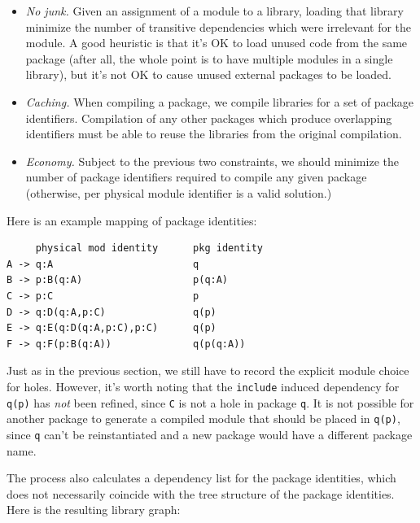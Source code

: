 \documentclass{article}
\begin{document}
\begin{itemize}

    \item \emph{No junk.} Given an assignment of a module to a library,
        loading that library minimize the number of transitive
        dependencies which were irrelevant for the module.  A good
        heuristic is that it's OK to load unused code from the same
        package (after all, the whole point is to have multiple modules
        in a single library), but it's not OK to cause unused external packages to
        be loaded.

    \item \emph{Caching.} When compiling a package, we compile libraries
        for a set of package identifiers. Compilation of any other
        packages which produce overlapping identifiers must be able to
        reuse the libraries from the original compilation.

    \item \emph{Economy.} Subject to the previous two constraints, we
        should minimize the number of package identifiers required
        to compile any given package (otherwise, per physical module
        identifier is a valid solution.)

\end{itemize}

Here is an example mapping of package identities:

\begin{verbatim}
     physical mod identity      pkg identity
A -> q:A                        q
B -> p:B(q:A)                   p(q:A)
C -> p:C                        p
D -> q:D(q:A,p:C)               q(p)
E -> q:E(q:D(q:A,p:C),p:C)      q(p)
F -> q:F(p:B(q:A))              q(p(q:A))
\end{verbatim}

Just as in the previous section, we still have to record the explicit
module choice for holes.  However, it's worth noting that the
\verb|include| induced dependency for \verb|q(p)| has \emph{not} been
refined, since \verb|C| is not a hole in package \verb|q|.  It is not
possible for another package to generate a compiled module that should
be placed in \verb|q(p)|, since \verb|q| can't be reinstantiated and a
new package would have a different package name.

The process also calculates a dependency list for the package
identities, which does not necessarily coincide with the tree structure
of the package identities. Here is the resulting library graph: \\
\end{document}
